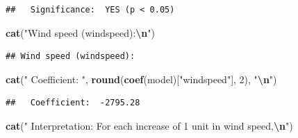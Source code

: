 \documentclass[
]{article}
\newenvironment{Shaded}{\begin{snugshade}}{\end{snugshade}}
\newcommand{\ControlFlowTok}[1]{\textcolor[rgb]{0.13,0.29,0.53}{\textbf{#1}}}
\newcommand{\DecValTok}[1]{\textcolor[rgb]{0.00,0.00,0.81}{#1}}
\newcommand{\FloatTok}[1]{\textcolor[rgb]{0.00,0.00,0.81}{#1}}
\newcommand{\FunctionTok}[1]{\textcolor[rgb]{0.13,0.29,0.53}{\textbf{#1}}}
\newcommand{\NormalTok}[1]{#1}
\newcommand{\SpecialCharTok}[1]{\textcolor[rgb]{0.81,0.36,0.00}{\textbf{#1}}}
\newcommand{\StringTok}[1]{\textcolor[rgb]{0.31,0.60,0.02}{#1}}
\begin{document}
\begin{Shaded}
\end{Shaded}

\begin{verbatim}
##   Significance:  YES (p < 0.05)
\end{verbatim}

\begin{Shaded}
\begin{Highlighting}[]
\FunctionTok{cat}\NormalTok{(}\StringTok{"Wind speed (windspeed):}\SpecialCharTok{\textbackslash{}n}\StringTok{"}\NormalTok{)}
\end{Highlighting}
\end{Shaded}

\begin{verbatim}
## Wind speed (windspeed):
\end{verbatim}

\begin{Shaded}
\begin{Highlighting}[]
\FunctionTok{cat}\NormalTok{(}\StringTok{"  Coefficient: "}\NormalTok{, }\FunctionTok{round}\NormalTok{(}\FunctionTok{coef}\NormalTok{(model)[}\StringTok{"windspeed"}\NormalTok{], }\DecValTok{2}\NormalTok{), }\StringTok{"}\SpecialCharTok{\textbackslash{}n}\StringTok{"}\NormalTok{)}
\end{Highlighting}
\end{Shaded}

\begin{verbatim}
##   Coefficient:  -2795.28
\end{verbatim}

\begin{Shaded}
\begin{Highlighting}[]
\FunctionTok{cat}\NormalTok{(}\StringTok{"  Interpretation: For each increase of 1 unit in wind speed,}\SpecialCharTok{\textbackslash{}n}\StringTok{"}\NormalTok{)}
\end{Highlighting}
\end{Shaded}
\end{document}
